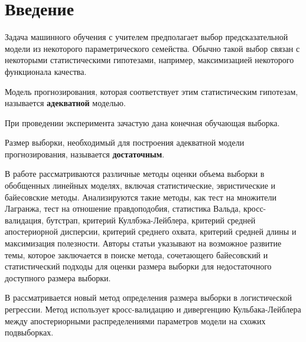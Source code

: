 \section{Введение}

Задача машинного обучения с учителем предполагает выбор предсказательной модели из некоторого параметрического семейства. Обычно такой выбор связан с некоторыми статистическими гипотезами, например, максимизацией некоторого функционала качества. 
\begin{definition}
    Модель прогнозирования, которая соответствует этим статистическим гипотезам, называется \textbf{адекватной} моделью.
\end{definition}

При проведении эксперимента зачастую дана конечная обучающая выборка.

\begin{definition}
    Размер выборки, необходимый для построения адекватной модели прогнозирования, называется \textbf{достаточным}.
\end{definition}

В работе \cite{Grabovoy2022} рассматриваются различные методы оценки объема выборки в обобщенных линейных моделях, включая статистические, эвристические и байесовские методы. Анализируются такие методы, как тест на множители Лагранжа, тест на отношение правдоподобия, статистика Вальда, кросс-валидация, бутстрап, критерий Куллбэка-Лейблера, критерий средней апостериорной дисперсии, критерий среднего охвата, критерий средней длины и максимизация полезности. Авторы статьи указывают на возможное развитие темы, которое заключается в поиске метода, сочетающего байесовский и статистический подходы для оценки размера выборки для недостаточного доступного размера выборки.

В \cite{MOTRENKO2014743} рассматривается новый метод определения размера выборки в логистической регрессии. Метод использует кросс-валидацию и дивергенцию Кульбака-Лейблера между апостериорными распределениями параметров модели на схожих подвыборках.